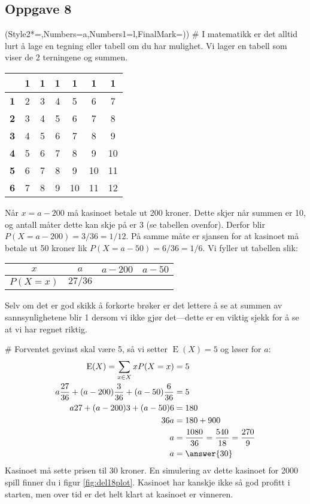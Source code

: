 \subsection*{Oppgave 8}
\begin{easylist}[enumerate]
	\ListProperties(Style2*=,Numbers=a,Numbers1=l,FinalMark={)})
	# I matematikk er det alltid lurt å lage en tegning eller tabell om du har mulighet.
	Vi lager en tabell som viser de 2 terningene og summen.
	\begin{center}
		\begin{tabular}{c|cccccc}
			& \textbf{1} & \textbf{1} & \textbf{1} & \textbf{1} & \textbf{1} & \textbf{1}  \\ \hline
		  \textbf{1} & 2 & 3 & 4 & 5 & 6 & 7  \\
		  \textbf{2} & 3 & 4 & 5 & 6 & 7 & 8  \\
		  \textbf{3} & 4 & 5 & 6 & 7 & 8 & 9  \\
		  \textbf{4} & 5 & 6 & 7 & 8 & 9 & 10  \\
		  \textbf{5} & 6 & 7 & 8 & 9 & 10 & 11  \\
		  \textbf{6} & 7 & 8 & 9 & 10 & 11 & 12  
		\end{tabular}
	\end{center}
	Når $x = a-200$ må kasinoet betale ut 200 kroner. Dette skjer når summen er 10, og antall måter dette kan skje på er 3 (se tabellen ovenfor). Derfor blir $P(X = a - 200) = 3 / 36 = 1/12$.
	På samme måte er sjansen for at kasinoet må betale ut 50 kroner lik $P(X = a - 50) = 6 / 36 = 1/6$.
	Vi fyller ut tabellen slik:
\begin{center}
	\begin{tabular}{|c|c|c|c|}
		\hline
		$x$ & $a$ & $a-200$ & $a-50$ \\ \hline
		$P(X = x)$ & $27 / 36$ & \answer{$3/36 = 1/12$} & \answer{$6/36 = 1/6$} \\ \hline
	\end{tabular}
\end{center}
	Selv om det er god skikk å forkorte brøker er det lettere å se at summen av sannsynlighetene blir 1 dersom vi ikke gjør det---dette er en viktig sjekk for å se at vi har regnet riktig.
	
	# Forventet gevinst skal være 5, så vi setter $\operatorname{E}(X) = 5$ og løser for $a$:
	\begin{align*}
		\operatorname{E}(X) = \sum_{x \in X} x P(X = x) &= 5 \\
		 a\frac{27}{36} + (a-200)\frac{3}{36}+ (a-50)\frac{6}{36} &= 5 \\
		a27 + (a-200)3 + (a-50)6 &= 180 \\
		36a &= 180 + 900 \\
		a &= \frac{1080}{36} = \frac{540}{18} = \frac{270}{9} \\
		a &= \answer{30} 
	\end{align*}
	Kasinoet må sette prisen til 30 kroner. En simulering av dette kasinoet for 2000 spill finner du i figur \ref{fig:del18plot}. Kasinoet har kanskje ikke så god profitt i starten, men over tid er det helt klart at kasinoet er vinneren.
	

\end{easylist}
